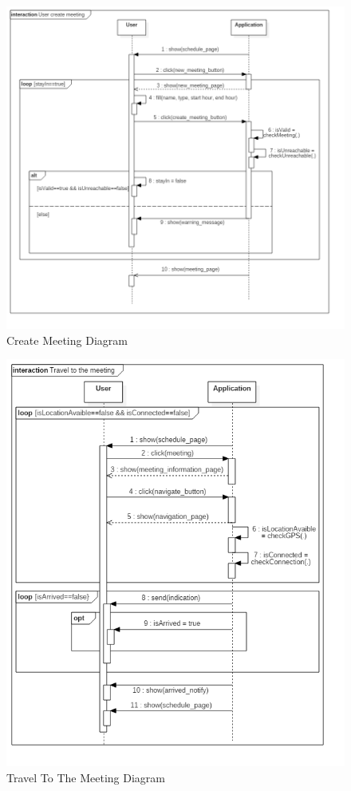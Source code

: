 \clearpage
\begin{figure}[!h]
\centering
\includegraphics[scale=0.6]{images/CreateMeetingDiagram}
\caption{Create Meeting Diagram}
\label{ref:createmeetingdiagram}
\end{figure}

\clearpage
\begin{figure}[!h]
\centering
\includegraphics[scale=0.7]{images/TravelToTheMeetingDiagram}
\caption{Travel To The Meeting Diagram}
\label{ref:traveltothemeetingdiagram}
\end{figure}

